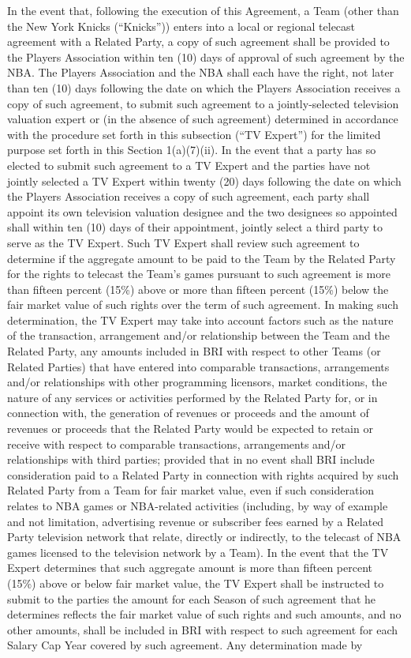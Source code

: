 \documentclass[
]{book}
\begin{document}
\begin{enumerate}
\begin{enumerate}
\begin{enumerate}
      In the event that, following the execution of this Agreement, a Team (other than the New York Knicks (``Knicks'')) enters into a local or regional telecast agreement with a Related Party, a copy of such agreement shall be provided to the Players Association within ten (10) days of approval of such agreement by the NBA. The Players Association and the NBA shall each have the right, not later than ten (10) days following the date on which the Players Association receives a copy of such agreement, to submit such agreement to a jointly-selected television valuation expert or (in the absence of such agreement) determined in accordance with the procedure set forth in this subsection (``TV Expert'') for the limited purpose set forth in this Section 1(a)(7)(ii). In the event that a party has so elected to submit such agreement to a TV Expert and the parties have not jointly selected a TV Expert within twenty (20) days following the date on which the Players Association receives a copy of such agreement, each party shall appoint its own television valuation designee and the two designees so appointed shall within ten (10) days of their appointment, jointly select a third party to serve as the TV Expert. Such TV Expert shall review such agreement to determine if the aggregate amount to be paid to the Team by the Related Party for the rights to telecast the Team's games pursuant to such agreement is more than fifteen percent (15\%) above or more than fifteen percent (15\%) below the fair market value of such rights over the term of such agreement. In making such determination, the TV Expert may take into account factors such as the nature of the transaction, arrangement and/or relationship between the Team and the Related Party, any amounts included in BRI with respect to other Teams (or Related Parties) that have entered into comparable transactions, arrangements and/or relationships with other programming licensors, market conditions, the nature of any services or activities performed by the Related Party for, or in connection with, the generation of revenues or proceeds and the amount of revenues or proceeds that the Related Party would be expected to retain or receive with respect to comparable transactions, arrangements and/or relationships with third parties; provided that in no event shall BRI include consideration paid to a Related Party in connection with rights acquired by such Related Party from a Team for fair market value, even if such consideration relates to NBA games or NBA-related activities (including, by way of example and not limitation, advertising revenue or subscriber fees earned by a Related Party television network that relate, directly or indirectly, to the telecast of NBA games licensed to the television network by a Team). In the event that the TV Expert determines that such aggregate amount is more than fifteen percent (15\%) above or below fair market value, the TV Expert shall be instructed to submit to the parties the amount for each Season of such agreement that he determines reflects the fair market value of such rights and such amounts, and no other amounts, shall be included in BRI with respect to such agreement for each Salary Cap Year covered by such agreement. Any determination made by 
\end{enumerate}
\end{enumerate}
\end{enumerate}
\end{document}
